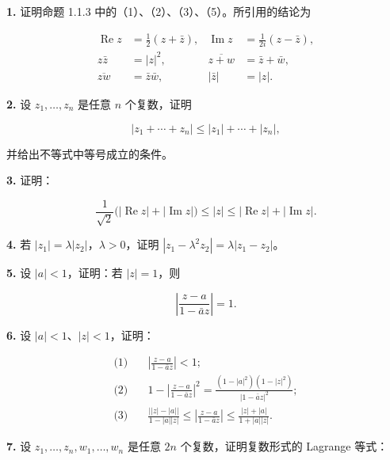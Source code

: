 \documentclass[11pt,a4paper]{article}
\begin{document}
\par{}
\noindent\textbf{1.} 证明命题 1.1.3
中的（1）、（2）、（3）、（5）。所引用的结论为

\[
\begin{aligned}
\operatorname{Re}z&=\tfrac12(z+\bar z),&\operatorname{Im}z&=\tfrac1{2i}(z-\bar z),\\
z\bar z&=|z|^2,&\overline{z+w}&=\bar z+\bar w,\\
\overline{zw}&=\bar z\bar w,&|\bar z|&=|z|.
\end{aligned}
\]

\par{}
\noindent\textbf{2.} 设 \(z_1,\ldots,z_n\) 是任意 \(n\) 个复数，证明

\[
|z_1+\cdots+z_n|\le |z_1|+\cdots+|z_n|,
\]

并给出不等式中等号成立的条件。

\par{}
\noindent\textbf{3.} 证明：

\[
\frac1{\sqrt2}\bigl(|\operatorname{Re}z|+|\operatorname{Im}z|\bigr)
\le|z|\le|\operatorname{Re}z|+|\operatorname{Im}z|.
\]

\par{}
\noindent\textbf{4.} 若 \(|z_1|=\lambda|z_2|\)，\(\lambda>0\)，证明
\(|z_1-\lambda^2z_2|=\lambda|z_1-z_2|\)。

\par{}
\noindent\textbf{5.} 设 \(|a|<1\)，证明：若 \(|z|=1\)，则

\[
\left|\frac{z-a}{1-\bar a z}\right|=1.
\]

\par{}
\noindent\textbf{6.} 设 \(|a|<1\)、\(|z|<1\)，证明：

\[
\begin{aligned}
\text{(1)}\quad &\left|\frac{z-a}{1-\bar a z}\right|<1;\\
\text{(2)}\quad &1-\left|\frac{z-a}{1-\bar a z}\right|^2
=\frac{(1-|a|^2)(1-|z|^2)}{|1-\bar a z|^2};\\
\text{(3)}\quad &\frac{\bigl||z|-|a|\bigr|}{1-|a||z|}
\le\left|\frac{z-a}{1-\bar a z}\right|
\le\frac{|z|+|a|}{1+|a||z|}.
\end{aligned}
\]

\par{}
\noindent\textbf{7.} 设 \(z_1,\ldots,z_n,w_1,\ldots,w_n\) 是任意 \(2n\)
个复数，证明复数形式的 Lagrange 等式：
\end{document}
